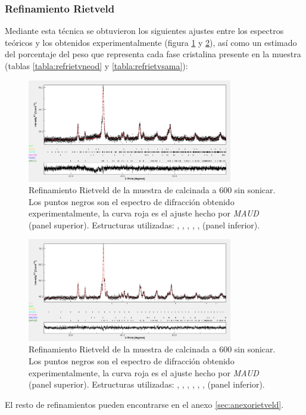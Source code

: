 \documentclass[../main.tex]{subfiles}
\begin{document}
\subsubsection{Refinamiento Rietveld}
Mediante esta técnica se obtuvieron los siguientes ajustes entre los espectros teóricos y los obtenidos experimentalmente (figura \ref{fig:rietveld600ndresultados} y \ref{fig:rietveld700smresultados}), así como un estimado del porcentaje del peso que representa cada fase cristalina presente en la muestra (tablas \ref{tabla:refrietvneod} y \ref{tabla:refrietvsama}):
\begin{figure}[H]
    \centering
    \includegraphics[width=0.8\textwidth]{fig/DRX600NdFeO3.png}
    \caption{Refinamiento Rietveld de la muestra de \neod{} calcinada a 600\gradoC{} sin sonicar. Los puntos negros son el espectro de difracción obtenido experimentalmente, la curva roja es el ajuste hecho por \textit{MAUD} (panel superior). Estructuras utilizadas: \neod{} \cite{ndfeo3},  \cite{ndoh3},  \cite{feoh2},  \cite{nd2o3},  \cite{fe2o3},  \cite{feo} (panel inferior).}
    \label{fig:rietveld600ndresultados}
\end{figure}
\begin{figure}[H]
    \centering
    \includegraphics[width=0.8\textwidth]{fig/DRX700SmFeO3.png}
    \caption{Refinamiento Rietveld de la muestra de \neod{} calcinada a 600\gradoC{} sin sonicar. Los puntos negros son el espectro de difracción obtenido experimentalmente, la curva roja es el ajuste hecho por \textit{MAUD} (panel superior). Estructuras utilizadas: \sama{} \cite{smfeo3},  \cite{smoh3},  \cite{feoh2},  \cite{sm2o3},  \cite{fe2o3},  \cite{smo},  \cite{feo} (panel inferior).}
    \label{fig:rietveld700smresultados}
\end{figure}
El resto de refinamientos pueden encontrarse en el anexo \ref{sec:anexorietveld}.
\end{document}
